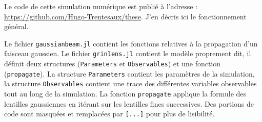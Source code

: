 Le code de cette simulation numérique est publié à l'adresse :
\\ \href{https://github.com/Hugo-Trentesaux/these}{https://github.com/Hugo-Trentesaux/these}.
J'en décris ici le fonctionnement général.

Le fichier \verb|gaussianbeam.jl| contient les fonctions relatives à la propagation d'un faisceau gaussien. Le fichier \verb|grinlens.jl| contient le modèle proprement dit, il définit deux structures (\verb|Parameters| et \verb|Observables|) et une fonction (\verb|propagate|). La structure \verb|Parameters| contient les paramètres de la simulation, la structure \verb|Observables| contient une trace des différentes variables observables tout au long de la simulation. La fonction \verb|propagate| applique la formule des lentilles gaussiennes en itérant sur les lentilles fines successives. Des portions de code sont masquées et remplacées par \verb|[...]| pour plus de lisibilité.

